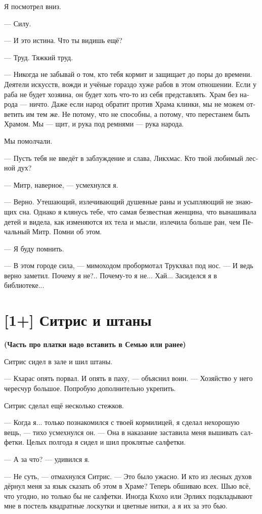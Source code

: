 \documentclass[a4paper,12pt,fleqn]{book}\usepackage{cooltooltips}\usepackage{polyglossia}\setdefaultlanguage[babelshorthands=true]{russian}\setotherlanguage{english}\defaultfontfeatures{Ligatures=TeX,Mapping=tex-text} \usepackage{xcolor}\definecolor{lightgray}{HTML}{bbbbbb}\color{lightgray}\newcommand{\ml}[3]{\textenglish{\textcolor{black}{#3}}}
\begin{document}
{Я посмотрел вниз.

--- Силу.

--- И это истина.
Что ты видишь ещё?

--- Труд.
Тяжкий труд.

--- Никогда не забывай о том, кто тебя кормит и защищает до поры до времени.
Деятели искусств, вожди и учёные гораздо хуже рабов в этом отношении.
Если у раба не будет хозяина, он будет хоть что-то из себя представлять.
Храм без народа --- ничто.
Даже если народ обратит против Храма клинки, мы не можем ответить им тем же.
Не потому, что не способны, а потому, что перестанем быть Храмом.
Мы --- щит, и рука под ремнями --- рука народа.

Мы помолчали.

--- Пусть тебя не введёт в заблуждение и слава, Ликхмас.
Кто твой любимый лесной дух?

--- Митр, наверное, --- усмехнулся я.

--- Верно.
Утешающий, излечивающий душевные раны и усыпляющий не знающих сна.
Однако я клянусь тебе, что самая безвестная женщина, что вынашивала детей и видела, как изменяются их тела и мысли, излечила больше ран, чем Печальный Митр.
Помни об этом.

--- Я буду помнить.

--- В этом городе сила, --- мимоходом пробормотал Трукхвал под нос.
--- И ведь верно заметил.
Почему я не?..
Почему-то я не...
Хай... Засиделся я в библиотеке...

\section{[1+] Ситрис и штаны}

\textbf{(Часть про платки надо вставить в Семью или ранее)}

Ситрис сидел в зале и шил штаны.

--- Кхарас опять порвал.
И опять в паху, --- объяснил воин.
--- Хозяйство у него чересчур большое.
Попробую дополнительно укрепить.

Ситрис сделал ещё несколько стежков.

--- Когда я... только познакомился с твоей кормилицей, я сделал нехорошую вещь, --- тихо усмехнулся он.
--- Она в наказание заставила меня вышивать салфетки.
Целых полгода я сидел и шил проклятые салфетки.

--- А за что? --- удивился я.

--- Не суть, --- отмахнулся Ситрис.
--- Это было ужасно.
И кто из лесных духов дёрнул меня за язык сказать об этом в Храме?
Теперь обшиваю всех.
Шью всё, что угодно, но только бы не салфетки.
Иногда Кхохо или Эрликх подкладывают мне в постель квадратные лоскутки и цветные нитки, а я их за это бью.

}
\end{document}
